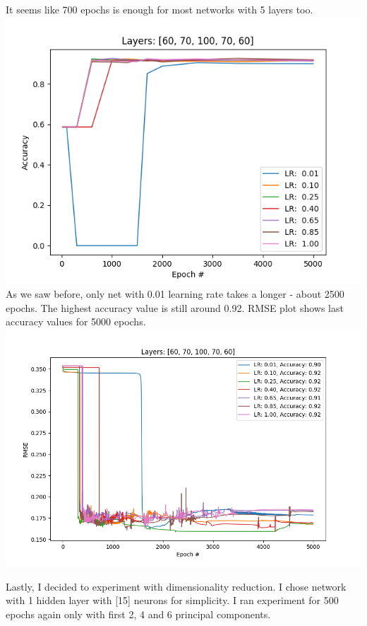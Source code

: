 \documentclass[12pt, letterpaper]{article}
\begin{document}
\begin{enumerate}[label=\Roman*.]
	    It seems like 700 epochs is enough for most networks with 5 layers too.
	    {\center \includegraphics[scale=0.7]{../images/accuracy2_1.png} \\}
	    As we saw before, only net with 0.01 learning rate takes a longer - about 2500 epochs. The highest accuracy value is still around 0.92.
	    RMSE plot shows last accuracy values for 5000 epochs.
	    {\center \includegraphics[scale=0.7]{../images/rmse3_1.png} \\}
	    
	    Lastly, I decided to experiment with dimensionality reduction. I chose network with 1 hidden layer with [15] neurons for simplicity. I ran experiment for 500 epochs again only with first 2, 4 and 6 principal components. \\
	    

\end{enumerate}
\end{document}
